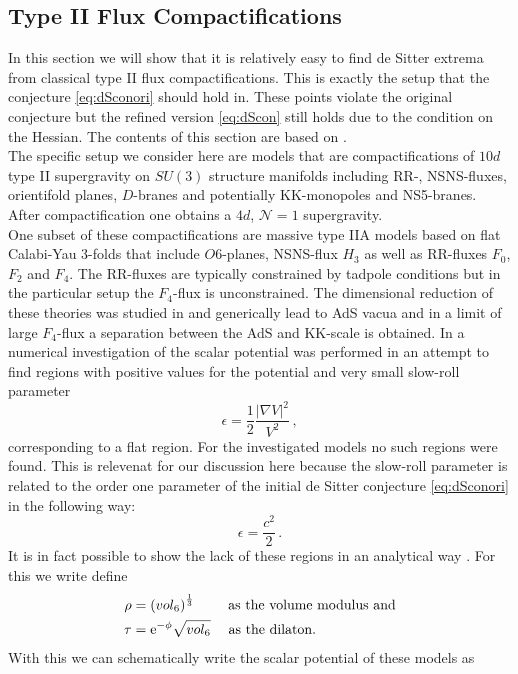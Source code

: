\documentclass[12pt]{report}
\newcommand{\be}{\begin{equation}}
\newcommand{\ee}{\end{equation}}
\newcommand{\bea}{\begin{equation}\begin{aligned}}
\newcommand{\eea}{\end{aligned}\end{equation}}
\def\rme{{\rm e}}
\begin{document}
\subsection{Type II Flux Compactifications}
In this section we will show that it is relatively easy to find de Sitter extrema from classical type II flux compactifications. This is exactly the setup that the conjecture \eqref{eq:dSconori} should hold in. These points violate the original conjecture but the refined version \eqref{eq:dScon} still holds due to the condition on the Hessian. The contents of this section are based on \cite{Roupec:2018mbn}.\\
The specific setup we consider here are models that are compactifications of $10d$ type II supergravity on $SU(3)$ structure manifolds including RR-, NSNS-fluxes, orientifold planes, $D$-branes and potentially KK-monopoles and NS5-branes. After compactification one obtains a $4d$, $\mathcal{N}=1$ supergravity.\\
One subset of these compactifications are massive type IIA models based on flat Calabi-Yau 3-folds that include $O6$-planes, NSNS-flux $H_3$ as well as RR-fluxes $F_0$, $F_2$ and $F_4$. The RR-fluxes are typically constrained by tadpole conditions but in the particular setup the $F_4$-flux is unconstrained. The dimensional reduction of these theories was studied in \cite{Grimm:2004ua} and generically lead to AdS vacua \cite{Villadoro:2005cu,DeWolfe:2005uu,Camara:2005dc,Ihl:2006pp} and in a limit of large $F_4$-flux a separation between the AdS and KK-scale is obtained. In \cite{Hertzberg:2007ke} a numerical investigation of the scalar potential was performed in an attempt to find regions with positive values for the potential and very small slow-roll parameter
\be 
\epsilon = \frac{1}{2} \frac{|\nabla V|^ 2}{V^ 2}\,,
\ee
corresponding to a flat region. For the investigated models \cite{Villadoro:2005cu,DeWolfe:2005uu,Ihl:2006pp} no such regions were found. This is relevenat for our discussion here because the slow-roll parameter is related to the order one parameter of the initial de Sitter conjecture \eqref{eq:dSconori} in the following way:
\be 
\epsilon = \frac{c^ 2}{2}\,.
\ee
It is in fact possible to show the lack of these regions in an analytical way \cite{Hertzberg:2007wc}. For this we write define 
\bea 
\rho &= \left(vol_6\right)^ {\frac{1}{3}} \;\qquad \text{as the volume modulus and}\\
\tau &= \rme^ {-\phi} \sqrt{vol_6} \;\quad \text{as the dilaton.}
\eea 
With this we can schematically write the scalar potential of these models as
\end{document}
